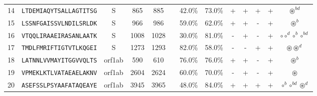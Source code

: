 \begin{tabular}{rcccccccccccc}
14 &  \texttt{LTDEMIAQYTSALLAGTITSG} &       S &    865 &   885 &                &                          42.0\% &                           73.0\% &          + &           + &          + &           + &                                                                                                          $ \circledast^{bd} $ \\
15 &  \texttt{LSSNFGAISSVLNDILSRLDK} &       S &    966 &   986 &                &                          59.0\% &                           62.0\% &          + &           + &          - &           + &                                                                                                             $ \circledast^b $ \\
16 &  \texttt{VTQQLIRAAEIRASANLAATK} &       S &   1008 &  1028 &                &                          30.0\% &                           81.0\% &          - &           + &          - &           + &                                                                                          $ \circ \circ^d \circ^b \circ^{bd} $ \\
17 &  \texttt{TMDLFMRIFTIGTVTLKQGEI} &       S &   1273 &  1293 &                &                          82.0\% &                           58.0\% &          - &           - &          + &           + &                                                                                                 $ \circledast \circledast^d $ \\
18 &  \texttt{LATNNLVVMAYITGGVVQLTS} &  orf1ab &    590 &   610 &                &                          76.0\% &                           76.0\% &          + &           + &          - &           + &                                                                                                             $ \circledast^b $ \\
19 &  \texttt{VPMEKLKTLVATAEAELAKNV} &  orf1ab &   2604 &  2624 &                &                          60.0\% &                           70.0\% &          - &           + &          - &           + &                                                                                                               $ \circledast $ \\
20 &  \texttt{ASEFSSLPSYAAFATAQEAYE} &  orf1ab &   3945 &  3965 &                &                          48.0\% &                           84.0\% &          + &           + &          + &           + &                                                                                          $ \circ^b \circ^{bd} \circledast^d $ \\

\end{tabular}
